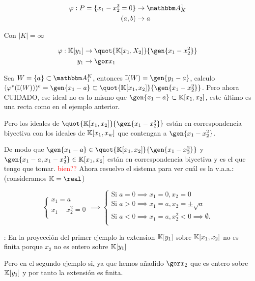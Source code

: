 \begin{example}
	\begin{align*}
	\varphi: P=\{ x_1-x_2^2=0 \} & \rightarrow \A^1_K \\
	(a,b) & \rightarrow a 
	\end{align*}
	
	Con $|K|=\infty$
	
	\begin{align*}
	\varphi: \K[y_1] & \rightarrow \quot{\K[x_1,X_2]}{\gen{x_1-x_2^2}} \\
	y_1 & \rightarrow \cls{x_1}
	\end{align*}
	
	Sea $W=\{a\} \subset \A^K_1$, entonces $\I(W) = \gen{y_1-a}$, calculo $(\varphi^*(\I(W)))^e=\gen{x_1-a} \subset \quot{\K[x_1,x_2]}{\gen{x_1-x_2^2}}$. Pero ahora CUIDADO, ese ideal no es lo mismo que $\gen{x_1-a} \subset \K[x_1,x_2]$, este último es una recta como en el ejemplo anterior.
	
	Pero los ideales de $\quot{\K[x_1,x_2]}{\gen{x_1-x_2^2}}$ están en correspondencia biyectiva con los ideales de $\mathbb{K}[x_1,x_w]$ que contengan a $\gen{x_1-x_2^2}$.
	
	De modo que $\gen{x_1-a} \in \quot{\K[x_1,x_2]}{\gen{x_1-x_2^2}} $ y $ \gen{x_1-a,x_1-x_2^2} \in \K[x_1,x_2]$ están en correspondencia biyectiva y es el que tengo que tomar. \textcolor{red}{bien??} Ahora resuelvo el sistema para ver cuál es la v.a.a.: (consideramos $\K=\real$)
	
	$$ 
	\left\{ \begin{array}{c}
	x_1=a \\
	x_1-x_2^2=0\\
	\end{array} \right.
	\implies 
	\left\{ \begin{array}{c}
	\text{Si } a=0 \implies x_1=0, x_2=0 \\
	\text{Si } a >0 \implies x_1=a, x_2=\pm \sqrt{a}\\
	\text{Si } a < 0 \implies x_1=a, x_2^2<0 \implies \emptyset.\\
	\end{array} \right.
	$$
	
	
\end{example}

\obs: En la proyección del primer ejemplo la extension $\mathbb{K}[y_1]$ sobre $\mathbb{K}[x_1,x_2]$ no es finita porque $x_2$ no es entero sobre $\mathbb{K}[y_1]$

Pero en el segundo ejemplo si, ya que hemos añadido $\cls{x_2}$ que es entero  sobre $\mathbb{K}[y_1]$ y por tanto la extensión es finita.

